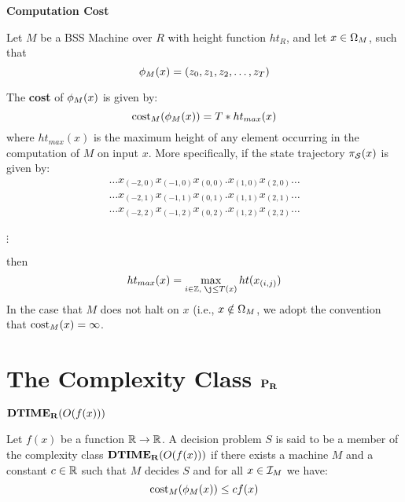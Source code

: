\begin{definition}{\textbf{Computation Cost}}
  
  Let $M$ be a BSS Machine over $R$ with height function $ht_R$, and
  let $x \in \Omega_M$, such that 
  $$\phi_M(x) = (z_0, z_1,z_2, \ldots, z_T)$$ 
  
  The \textbf{cost} of $\phi_M(x)$ is given by:
  $$\text{cost}_M(\phi_M(x)) = T*ht_{max}(x)$$
  where $ht_{max}(x)$ is the maximum height of any element occurring
  in the computation of $M$ on input $x$.  More specifically, if the
  state trajectory $\pi_{\mathcal{S}}(x)$ is given by: 
  \begin{eqnarray*}
    \ldots x_{(-2,0)}x_{(-1,0)}x_{(0,0)}.x_{(1,0)}x_{(2,0)} \ldots \\ 
    \ldots x_{(-2,1)}x_{(-1,1)}x_{(0,1)}.x_{(1,1)}x_{(2,1)} \ldots \\ 
    \ldots x_{(-2,2)}x_{(-1,2)}x_{(0,2)}.x_{(1,2)}x_{(2,2)} \ldots \\
  \end{eqnarray*}
  
  \vspace{-\baselineskip}
  \centerline{$\vdots$}

  then $$ht_{max}(x) = \max_{i \in \integers, \; \j \leq T(x)}ht(x_{(i,j)})$$
  In the case that $M$ does not halt on $x$ (i.e., $x \notin
  \Omega_M$, we adopt the convention that $\text{cost}_M(x) = \infty$.
\end{definition}


\section{The Complexity Class $\mathbf{P_R}$}

\begin{definition}\textbf{$\mathbf{DTIME_R}(O(f(x)))$}

  Let $f(x)$ be a function $\mathbb{R} \rightarrow \mathbb{R}$.  A decision
  problem $S$ is said to be a member of the complexity class
  $\mathbf{DTIME_R}(O(f(x)))$ if there exists a machine $M$ and a constant $c
  \in \mathbb{R}$ such that $M$ decides $S$ and for all $x \in \mathcal{I}_M$
  we have:
  $$\text{cost}_M(\phi_M(x)) \leq cf(x)$$
\end{definition}

